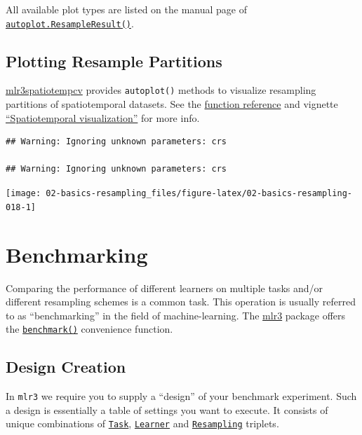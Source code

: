 \documentclass[
]{scrbook}
\begin{document}
All available plot types are listed on the manual page of \href{https://mlr3viz.mlr-org.com/reference/autoplot.ResampleResult.html}{\texttt{autoplot.ResampleResult()}}.

\hypertarget{autoplot-resample-partition}{%
\subsection{Plotting Resample Partitions}\label{autoplot-resample-partition}}

\href{https://mlr3spatiotempcv.mlr-org.com}{mlr3spatiotempcv} provides \texttt{autoplot()} methods to visualize resampling partitions of spatiotemporal datasets.
See the \href{https://mlr3spatiotempcv.mlr-org.com/reference}{function reference} and vignette \href{https://mlr3spatiotempcv.mlr-org.com/articles/spatiotemp-viz.html}{``Spatiotemporal visualization''} for more info.

\begin{verbatim}
## Warning: Ignoring unknown parameters: crs

## Warning: Ignoring unknown parameters: crs
\end{verbatim}

\begin{center}\texttt{[image: 02-basics-resampling\_files/figure-latex/02-basics-resampling-018-1]} \end{center}

\hypertarget{benchmarking}{%
\section{Benchmarking}\label{benchmarking}}

Comparing the performance of different learners on multiple tasks and/or different resampling schemes is a common task.
This operation is usually referred to as ``benchmarking'' in the field of machine-learning.
The \href{https://mlr3.mlr-org.com}{mlr3} package offers the \href{https://mlr3.mlr-org.com/reference/benchmark.html}{\texttt{benchmark()}} convenience function.

\hypertarget{bm-design}{%
\subsection{Design Creation}\label{bm-design}}

In \texttt{mlr3} we require you to supply a ``design'' of your benchmark experiment.
Such a design is essentially a table of settings you want to execute.
It consists of unique combinations of \href{https://mlr3.mlr-org.com/reference/Task.html}{\texttt{Task}}, \href{https://mlr3.mlr-org.com/reference/Learner.html}{\texttt{Learner}} and \href{https://mlr3.mlr-org.com/reference/Resampling.html}{\texttt{Resampling}} triplets.
\end{document}
